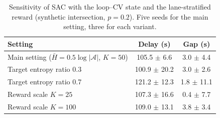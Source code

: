 \begin{table}[t]
\centering
\caption{Sensitivity of SAC with the loop--CV state and the lane-stratified reward (synthetic intersection, $p=0.2$). Five seeds for the main setting, three for each variant.}
\label{tab:sensitivity}
\small
\begin{tabular}{@{}lcc@{}}
\toprule
Setting & Delay (s) & Gap (s)\\
\midrule
Main setting ($\bar H = 0.5\log|\mathcal{A}|$, $K=50$) & 105.5 $\pm$ 6.6 & 3.0 $\pm$ 4.4\\
Target entropy ratio 0.3 & 100.9 $\pm$ 20.2 & 3.0 $\pm$ 2.6\\
Target entropy ratio 0.7 & 121.2 $\pm$ 12.3 & 1.8 $\pm$ 11.1\\
Reward scale $K=25$ & 107.3 $\pm$ 16.6 & 0.4 $\pm$ 7.7\\
Reward scale $K=100$ & 109.0 $\pm$ 13.1 & 3.8 $\pm$ 3.4\\
\bottomrule
\end{tabular}
\end{table}
